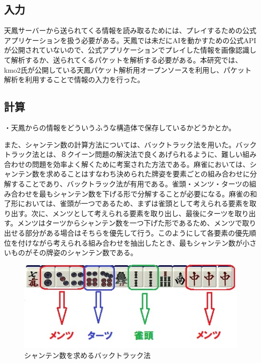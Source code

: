 \subsection{入力}
天鳳サーバーから送られてくる情報を読み取るためには、プレイするための公式アプリケーションを扱う必要がある。天鳳では未だにAIを動かすための公式APIが公開されていないので、公式アプリケーションでプレイした情報を画像認識して解析するか、送られてくるパケットを解析する必要がある。本研究では、kmo2氏が公開している天鳳パケット解析用オープンソース\cite{kmo2}を利用し、パケット解析を利用することで情報の入力を行った。

\subsection{計算}
・天鳳からの情報をどういうふうな構造体で保存しているかどうかとか。


また、シャンテン数の計算方法については、バックトラック法を用いた。バックトラック法とは、８クイーン問題の解決法で良くあげられるように、難しい組み合わせの問題を効率よく解くために考案された方法である。麻雀においては、シャンテン数を求めることはすなわち決められた牌姿を要素ごとの組み合わせに分解することであり、バックトラック法が有用である。雀頭・メンツ・ターツの組み合わせを最もシャンテン数を下げる形で分解することが必要になる。麻雀の和了形においては、雀頭が一つであるため、まずは雀頭として考えられる要素を取り出す。次に、メンツとして考えられる要素を取り出し、最後にターツを取り出す。メンツはターツからシャンテン数を一つ下げた形であるため、メンツで取り出せる部分がある場合はそちらを優先して行う。このようにして各要素の優先順位を付けながら考えられる組み合わせを抽出したとき、最もシャンテン数が小さいものがその牌姿のシャンテン数である。

\begin{figure}[h]
 \centering
 \includegraphics[keepaspectratio, scale=1,bb=0 0 320 220]
      {img/back.jpg}
 \caption{シャンテン数を求めるバックトラック法}
 \label{zu}
\end{figure}

